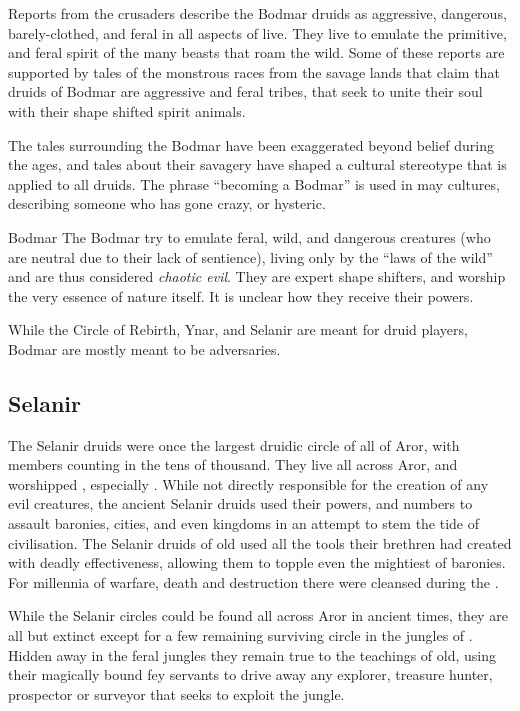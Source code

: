 Reports from the crusaders describe the Bodmar druids as aggressive,
dangerous, barely-clothed, and feral in all aspects of live. They live to
emulate the primitive, and feral spirit of the many beasts that roam the wild.
Some of these reports are supported by tales of the monstrous races from the
savage lands that claim that druids of Bodmar are aggressive and feral
tribes, that seek to unite their soul with their shape shifted spirit animals.

The tales surrounding the Bodmar have been exaggerated beyond belief during the
ages, and tales about their savagery have shaped a cultural stereotype that is
applied to all druids. The phrase ``becoming a Bodmar'' is used in may cultures,
describing someone who has gone crazy, or hysteric.

\begin{35e}{Bodmar}
  The Bodmar try to emulate feral, wild, and dangerous creatures (who are
  neutral due to their lack of sentience), living only by the ``laws of the
  wild'' and are thus considered \emph{chaotic evil}. They are expert shape
  shifters, and worship the very essence of nature itself. It is unclear how
  they receive their powers.
\end{35e}

\begin{note}
  While the Circle of Rebirth, Ynar, and Selanir are meant for druid players,
  Bodmar are mostly meant to be adversaries.
\end{note}

\subsection{Selanir}
\label{sec:Selanir}

The Selanir druids were once the largest druidic circle of all of Aror, with
members counting in the tens of thousand. They live all across Aror, and
worshipped , especially . While not
directly responsible for the creation of any evil creatures, the ancient
Selanir druids used their powers, and numbers to assault baronies, cities, and
even kingdoms in an attempt to stem the tide of civilisation. The Selanir
druids of old used all the tools their brethren had created with deadly
effectiveness, allowing them to topple even the mightiest of baronies. For
millennia of warfare, death and destruction there were cleansed during the
.

While the Selanir circles could be found all across Aror in ancient times,
they are all but extinct except for a few remaining surviving circle in
the jungles of . Hidden away in the feral jungles they
remain true to the teachings of old, using their magically bound fey servants
to drive away any explorer, treasure hunter, prospector or surveyor that
seeks to exploit the jungle.

